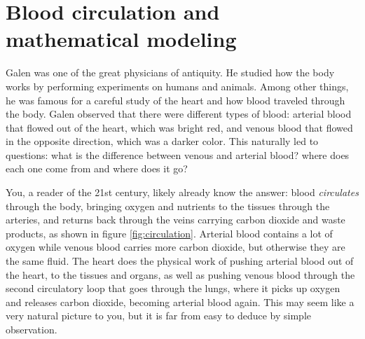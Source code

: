 \documentclass[
  letterpaper,
  DIV=11,
  numbers=noendperiod]{scrreprt}
\begin{document}
\hypertarget{sec:bio1}{%
\section{Blood circulation and mathematical modeling}\label{sec:bio1}}

Galen was one of the great physicians of antiquity. He studied how the
body works by performing experiments on humans and animals. Among other
things, he was famous for a careful study of the heart and how blood
traveled through the body. Galen observed that there were different
types of blood: arterial blood that flowed out of the heart, which was
bright red, and venous blood that flowed in the opposite direction,
which was a darker color. This naturally led to questions: what is the
difference between venous and arterial blood? where does each one come
from and where does it go?

You, a reader of the 21st century, likely already know the answer: blood
\emph{circulates} through the body, bringing oxygen and nutrients to the
tissues through the arteries, and returns back through the veins
carrying carbon dioxide and waste products, as shown in figure
\ref{fig:circulation}. Arterial blood contains a lot of oxygen while
venous blood carries more carbon dioxide, but otherwise they are the
same fluid. The heart does the physical work of pushing arterial blood
out of the heart, to the tissues and organs, as well as pushing venous
blood through the second circulatory loop that goes through the lungs,
where it picks up oxygen and releases carbon dioxide, becoming arterial
blood again. This may seem like a very natural picture to you, but it is
far from easy to deduce by simple observation.
\end{document}
